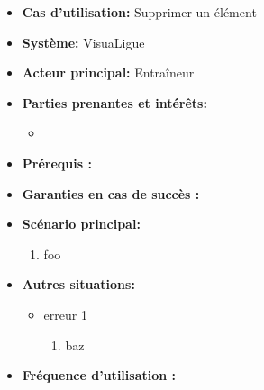 \begin{itemize}
    \item \textbf{Cas d'utilisation:} Supprimer un \'el\'ement
    \item \textbf{Syst\`eme:} VisuaLigue
    \item \textbf{Acteur principal:} Entra\^ineur
    \item \textbf{Parties prenantes et int\'er\^ets:}
    	\begin{itemize}
    		\item
    	\end{itemize}
    \item \textbf{Pr\'erequis :}
    \item \textbf{Garanties en cas de succ\`es :}
    \item \textbf{Sc\'enario principal:}
        \begin{enumerate}
            \item foo
        \end{enumerate}
    \item \textbf{Autres situations:}
        \begin{itemize}
            \item erreur 1
                \begin{enumerate}
                    \item baz
                \end{enumerate}
        \end{itemize}
    \item \textbf{Fréquence d'utilisation :}
\end{itemize}



